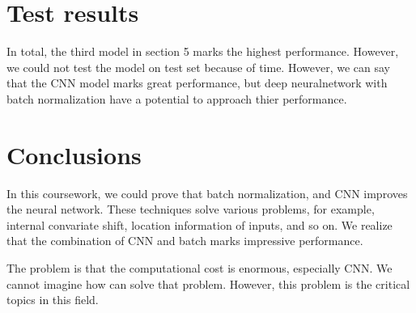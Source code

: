 \documentclass{article}
\begin{document}
\section{Test results}
In total, the third model in section 5 marks the highest performance. However, we could not test the model on test set because of time. However, we can say that the CNN model marks great performance, but deep neuralnetwork with batch normalization have a potential to approach thier performance.


\section{Conclusions}
\label{sec:concl}
In this coursework, we could prove that batch normalization, and CNN improves the neural network. These techniques solve various problems, for example, internal convariate shift, location information of inputs, and so on. We realize that the combination of CNN and batch marks impressive performance.

The problem is that the computational cost is enormous, especially CNN. We cannot imagine how can solve that problem. However, this problem is the critical topics in this field.%
%
\end{document}
